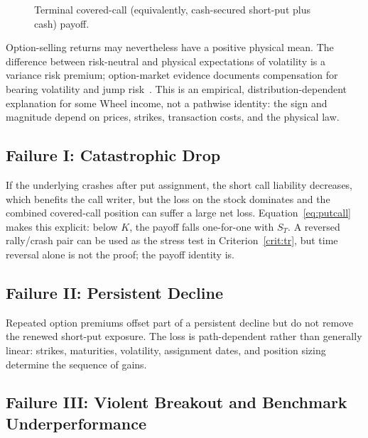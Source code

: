 \documentclass[aps,pra,reprint,superscriptaddress,amsmath,amssymb,floatfix]{revtex4-2}
\theoremstyle{plain}
\theoremstyle{definition}
\theoremstyle{remark}
\begin{document}
\begin{figure}[t]
\centering
{}
\caption{\label{fig:wheelpayoff}Terminal covered-call (equivalently,
cash-secured short-put plus cash) payoff.}
\end{figure}

Option-selling returns may nevertheless have a positive physical mean. The
difference between risk-neutral and physical expectations of volatility is a
variance risk premium; option-market evidence documents compensation for
bearing volatility and jump risk~\cite{BakshiKapadia2003,CarrWu2009}. This is
an empirical, distribution-dependent explanation for some Wheel income, not a
pathwise identity: the sign and magnitude depend on prices, strikes,
transaction costs, and the physical law.

\subsection{Failure I: Catastrophic Drop}

If the underlying crashes after put assignment, the short call liability
decreases, which benefits the call writer, but the loss on the stock dominates
and the combined covered-call position can suffer a large net loss.
Equation~\eqref{eq:putcall} makes this explicit: below \(K\), the payoff falls
one-for-one with \(S_T\). A reversed rally/crash pair can be used as the stress
test in Criterion~\ref{crit:tr}, but time reversal alone is not the proof; the
payoff identity is.

\subsection{Failure II: Persistent Decline}

Repeated option premiums offset part of a persistent decline but do not remove
the renewed short-put exposure. The loss is path-dependent rather than
generally linear: strikes, maturities, volatility, assignment dates, and
position sizing determine the sequence of gains.

\subsection{Failure III: Violent Breakout and Benchmark Underperformance}
\end{document}
